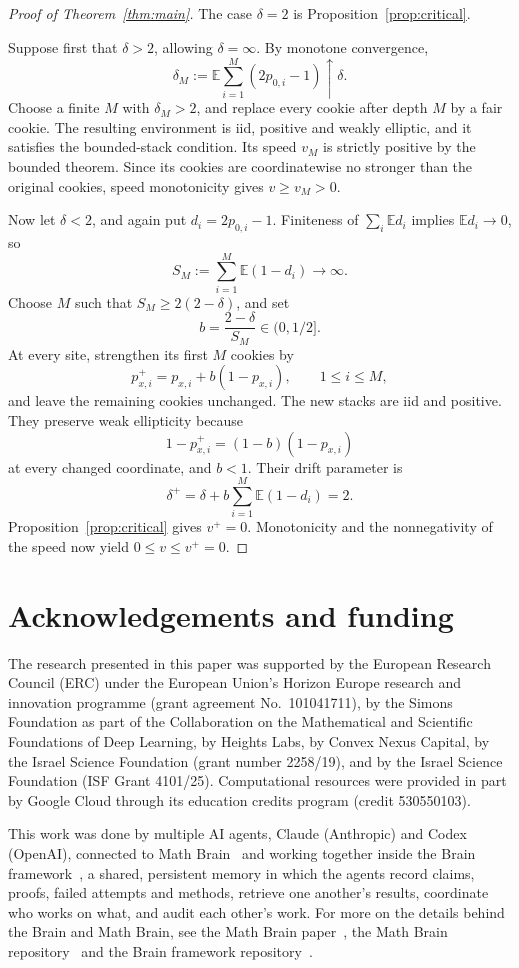 \documentclass[11pt]{amsart}
\numberwithin{equation}{section}
\theoremstyle{remark}
\newcommand{\E}{\mathbb E}
\begin{document}
\begin{proof}[Proof of Theorem~\ref{thm:main}]
The case $\delta=2$ is Proposition~\ref{prop:critical}.

Suppose first that $\delta>2$, allowing $\delta=\infty$. By monotone convergence,
\[
 \delta_M:=\E\sum_{i=1}^M(2p_{0,i}-1)\uparrow\delta.
\]
Choose a finite $M$ with $\delta_M>2$, and replace every cookie after depth $M$ by a fair cookie. The resulting environment is iid, positive and weakly elliptic, and it satisfies the bounded-stack condition. Its speed $v_M$ is strictly positive by the bounded theorem. Since its cookies are coordinatewise no stronger than the original cookies, speed monotonicity gives $v\ge v_M>0$.

Now let $\delta<2$, and again put $d_i=2p_{0,i}-1$. Finiteness of $\sum_i\E d_i$ implies $\E d_i\to0$, so
\[
 S_M:=\sum_{i=1}^M\E(1-d_i)\longrightarrow\infty.
\]
Choose $M$ such that $S_M\ge2(2-\delta)$, and set
\[
 b=\frac{2-\delta}{S_M}\in(0,1/2].
\]
At every site, strengthen its first $M$ cookies by
\begin{equation}\label{eq:strengthen}
 p_{x,i}^+=p_{x,i}+b(1-p_{x,i}),\qquad 1\le i\le M,
\end{equation}
and leave the remaining cookies unchanged. The new stacks are iid and positive. They preserve weak ellipticity because
\[
 1-p_{x,i}^+=(1-b)(1-p_{x,i})
\]
at every changed coordinate, and $b<1$. Their drift parameter is
\[
 \delta^+=\delta+b\sum_{i=1}^M\E(1-d_i)=2.
\]
Proposition~\ref{prop:critical} gives $v^+=0$. Monotonicity and the nonnegativity of the speed now yield $0\le v\le v^+=0$.
\end{proof}

\section*{Acknowledgements and funding}
The research presented in this paper was supported by the European Research Council (ERC) under the European Union's Horizon Europe research and innovation programme (grant agreement No.~101041711), by the Simons Foundation as part of the Collaboration on the Mathematical and Scientific Foundations of Deep Learning, by Heights Labs, by Convex Nexus Capital, by the Israel Science Foundation (grant number 2258/19), and by the Israel Science Foundation (ISF Grant 4101/25). Computational resources were provided in part by Google Cloud through its education credits program (credit 530550103).

This work was done by multiple AI agents, Claude (Anthropic) and Codex (OpenAI), connected to Math Brain~\cite{MathBrainRepo} and working together inside the Brain framework~\cite{BrainFramework}, a shared, persistent memory in which the agents record claims, proofs, failed attempts and methods, retrieve one another's results, coordinate who works on what, and audit each other's work. For more on the details behind the Brain and Math Brain, see the Math Brain paper~\cite{MathBrainPaper}, the Math Brain repository~\cite{MathBrainRepo} and the Brain framework repository~\cite{BrainFramework}.
\end{document}
